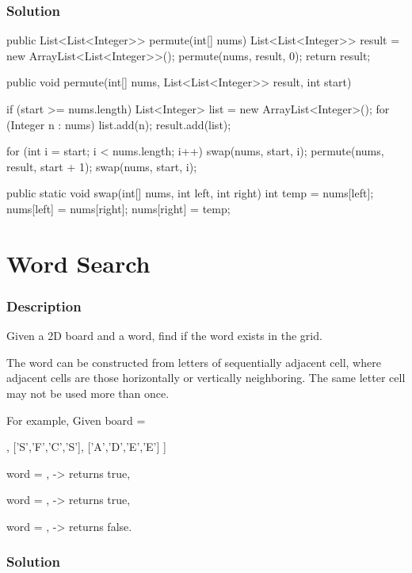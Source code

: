 \subsubsection{Solution}
\begin{Code}
public List<List<Integer>> permute(int[] nums) {
    List<List<Integer>> result = new ArrayList<List<Integer>>();
    permute(nums, result, 0);
    return result;
}

public void permute(int[] nums, List<List<Integer>> result, int start) {
    if (start >= nums.length) {
        List<Integer> list = new ArrayList<Integer>();
        for (Integer n : nums) {
            list.add(n);
        }
        result.add(list);
    }

    for (int i = start; i < nums.length; i++) {
        swap(nums, start, i);
        permute(nums, result, start + 1);
        swap(nums, start, i);
    }
}

public static void swap(int[] nums, int left, int right) {
    int temp = nums[left];
    nums[left] = nums[right];
    nums[right] = temp;
}
\end{Code}

\newpage

\section{Word Search} %

\subsubsection{Description}
Given a 2D board and a word, find if the word exists in the grid.

The word can be constructed from letters of sequentially adjacent cell, where adjacent cells are those horizontally or vertically neighboring. The same letter cell may not be used more than once.

For example,
Given board =
\begin{Code}
[
  ['A','B','C','E'],
  ['S','F','C','S'],
  ['A','D','E','E']
]
\end{Code}

word = , -> returns true,

word = , -> returns true,

word = , -> returns false.

\subsubsection{Solution}

